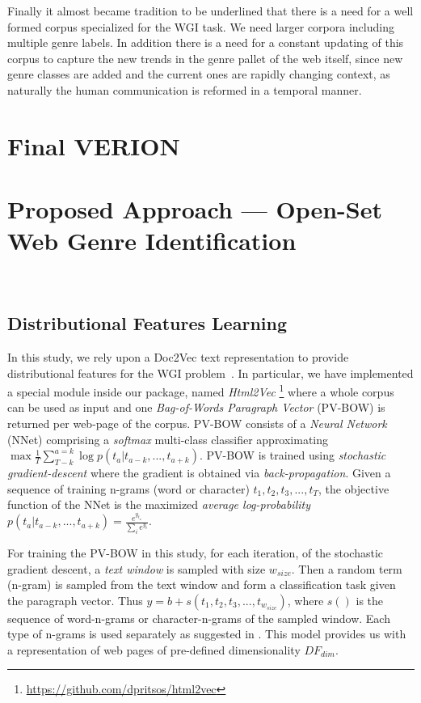 Finally it almost became tradition to be underlined that there is a need for a well formed corpus specialized for the WGI task. We need larger corpora including multiple genre labels. In addition there is a need for a constant updating of this corpus to capture the new trends in the genre pallet of the web itself, since new genre classes are added and the current ones are rapidly changing context, as naturally the human communication is reformed in a temporal manner.


\section{Final VERION}

\section{Proposed Approach --- Open-Set Web Genre Identification}~\label{sec:approach}

\subsection{Distributional Features Learning}\label{sec:Gensim}

In this study, we rely upon a Doc2Vec text representation to provide distributional features for the WGI problem~\cite{rehurek_lrec,mikolov2013efficient,mikolov2013distributed}. In particular, we have implemented a special module inside our package, named \textit{Html2Vec} \footnote{\url{https://github.com/dpritsos/html2vec}} 
where a whole corpus can be used as input and one \textit{Bag-of-Words Paragraph Vector} (PV-BOW) is returned per web-page of the corpus. PV-BOW consists of a \textit{Neural Network} (NNet) comprising a \textit{softmax} multi-class classifier approximating $ \max{\frac{1}{T} \sum^{a=k}_{T-k}{\log{p(t_{a}|t_{a-k},...,t_{a+k})}}}$. PV-BOW is trained using \textit{stochastic gradient-descent} where the gradient is obtained via  \textit{back-propagation}. Given a sequence of training n-grams (word or character) $t_{1}, t_{2}, t_{3}, ..., t_{T}$, the objective function of the NNet is the maximized \textit{average log-probability} $p(t_{a}|t_{a-k},...,t_{a+k}) = \frac{e^{y_{t_{a}}}}{\sum_{i}{e^{y_i}}}$.

For training the PV-BOW in this study, for each iteration, of the stochastic gradient descent, a \textit{text window} is sampled with size $w_{size}$. Then a random term (n-gram) is sampled from the text window and form a classification task given the paragraph vector. Thus $y = b + s(t_{1},t_{2},t_{3},...,t_{w_{size}})$, where $s()$ is the sequence of word-n-grams or character-n-grams of the sampled window. Each type of n-grams is used separately as suggested in \cite{posadas2017application}. This model provides us with a representation of web pages of pre-defined dimensionality $DF_{dim}$.

